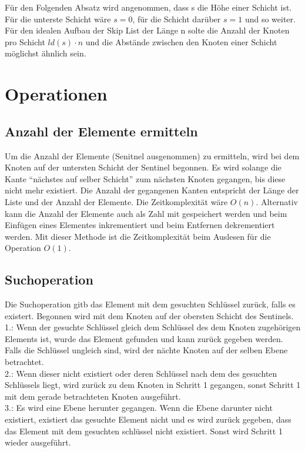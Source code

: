 \documentclass{TUBAFarbeiten}
\begin{document}
Für den Folgenden Absatz wird angenommen, dass s die Höhe einer Schicht ist. Für die unterste Schicht wäre \(s = 0\), für die Schicht darüber \(s = 1\) und so weiter.
Für den idealen Aufbau der Skip List der Länge n solte die Anzahl der Knoten pro Schicht \(ld(s) \cdot n\) und die Abstände zwischen den Knoten einer Schicht möglichst ähnlich sein. 

\section{Operationen}

\subsection{Anzahl der Elemente ermitteln}

Um die Anzahl der Elemente (Senitnel ausgenommen) zu ermitteln, wird bei dem Knoten auf der untersten Schicht der Sentinel begonnen. Es wird solange die Kante "`nächstes auf selber Schicht"' zum nächsten Knoten gegangen, bis diese nicht mehr existiert. Die Anzahl der gegangenen Kanten entspricht der Länge der Liste und der Anzahl der Elemente.  Die Zeitkomplexität wäre \(O(n)\).
Alternativ kann die Anzahl der Elemente auch als Zahl mit gespeichert werden und beim Einfügen eines Elementes inkrementiert und beim Entfernen dekrementiert werden. Mit dieser Methode ist die Zeitkomplexität beim Auslesen für die Operation \(O(1)\).

\subsection{Suchoperation}

Die Suchoperation gitb das Element mit dem gesuchten Schlüssel zurück, falls es existert.
Begonnen wird mit dem Knoten auf der obersten Schicht des Sentinels.\\
1.: Wenn der gesuchte Schlüssel gleich dem Schlüssel des dem Knoten zugehörigen Elements ist, wurde das Element gefunden und kann zurück gegeben werden. Falls die Schlüssel ungleich sind, wird der nächte Knoten auf der selben Ebene betrachtet.\\
2.: Wenn dieser nicht existiert oder deren Schlüssel nach dem des gesuchten Schlüssels liegt, wird zurück zu dem Knoten in Schritt 1 gegangen, sonst Schritt 1 mit dem gerade betrachteten Knoten ausgeführt.\\
3.: Es wird eine Ebene herunter gegangen. Wenn die Ebene darunter nicht existiert, existiert das gesuchte Element nicht und es wird zurück gegeben, dass das Element mit dem gesuchten schlüssel nicht existiert. Sonst wird Schritt 1 wieder ausgeführt.
\end{document}
